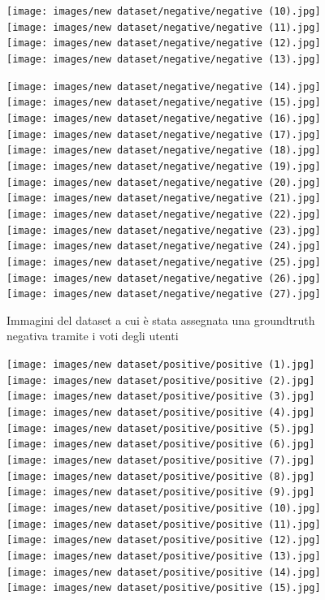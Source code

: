 \begin{figure}[H]
\centering
\texttt{[image: images/new dataset/negative/negative (10).jpg]}
\quad
\texttt{[image: images/new dataset/negative/negative (11).jpg]}
\quad
\texttt{[image: images/new dataset/negative/negative (12).jpg]}
\quad
\texttt{[image: images/new dataset/negative/negative (13).jpg]}
\quad
\vspace{5mm}

\texttt{[image: images/new dataset/negative/negative (14).jpg]}
\quad
\texttt{[image: images/new dataset/negative/negative (15).jpg]}
\quad
\texttt{[image: images/new dataset/negative/negative (16).jpg]}
\quad
\vspace{5mm}
\texttt{[image: images/new dataset/negative/negative (17).jpg]}
\quad
\texttt{[image: images/new dataset/negative/negative (18).jpg]}
\quad
\texttt{[image: images/new dataset/negative/negative (19).jpg]}
\quad
\texttt{[image: images/new dataset/negative/negative (20).jpg]}
\quad 
\vspace{5mm}
\texttt{[image: images/new dataset/negative/negative (21).jpg]}
\quad
\texttt{[image: images/new dataset/negative/negative (22).jpg]}
\quad
\vspace{5mm}
\texttt{[image: images/new dataset/negative/negative (23).jpg]}
\quad
\texttt{[image: images/new dataset/negative/negative (24).jpg]}
\quad
\texttt{[image: images/new dataset/negative/negative (25).jpg]}
\quad
\texttt{[image: images/new dataset/negative/negative (26).jpg]}
\quad
\texttt{[image: images/new dataset/negative/negative (27).jpg]}
\caption{Immagini del dataset a cui è stata assegnata una groundtruth negativa tramite i voti degli utenti}
\label{negativeNew}
\end{figure}

\begin{figure}[H]
\centering
\texttt{[image: images/new dataset/positive/positive (1).jpg]}
\quad
\texttt{[image: images/new dataset/positive/positive (2).jpg]}\quad
\texttt{[image: images/new dataset/positive/positive (3).jpg]}\quad
\vspace{5mm}
\texttt{[image: images/new dataset/positive/positive (4).jpg]}\quad
\texttt{[image: images/new dataset/positive/positive (5).jpg]}\quad
\texttt{[image: images/new dataset/positive/positive (6).jpg]}\quad
\vspace{5mm}
\texttt{[image: images/new dataset/positive/positive (7).jpg]}\quad
\texttt{[image: images/new dataset/positive/positive (8).jpg]}\quad
\vspace{5mm}
\texttt{[image: images/new dataset/positive/positive (9).jpg]}\quad
\texttt{[image: images/new dataset/positive/positive (10).jpg]}\quad
\vspace{5mm}
\texttt{[image: images/new dataset/positive/positive (11).jpg]}\quad
\texttt{[image: images/new dataset/positive/positive (12).jpg]}\quad
\texttt{[image: images/new dataset/positive/positive (13).jpg]}\quad
\vspace{5mm}
\texttt{[image: images/new dataset/positive/positive (14).jpg]}\quad
\texttt{[image: images/new dataset/positive/positive (15).jpg]}\quad
\end{figure}


